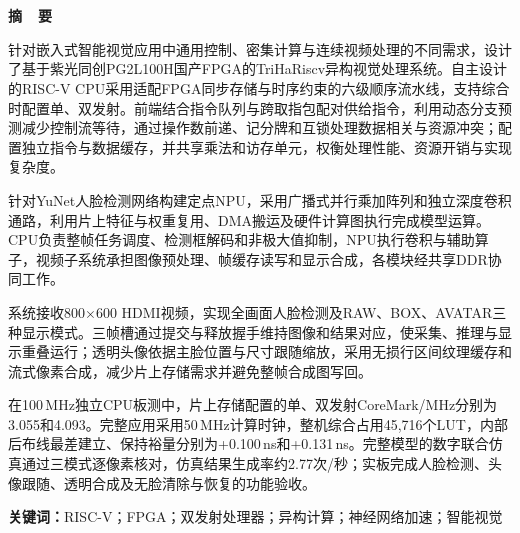 \chapter*{\worktitle}

\begin{center}
\sffamily\bfseries{} 摘\ \ 要
\end{center}

针对嵌入式智能视觉应用中通用控制、密集计算与连续视频处理的不同需求，设计了基于紫光同创PG2L100H国产FPGA的TriHaRiscv异构视觉处理系统。自主设计的RISC-V CPU采用适配FPGA同步存储与时序约束的六级顺序流水线，支持综合时配置单、双发射。前端结合指令队列与跨取指包配对供给指令，利用动态分支预测减少控制流等待，通过操作数前递、记分牌和互锁处理数据相关与资源冲突；配置独立指令与数据缓存，并共享乘法和访存单元，权衡处理性能、资源开销与实现复杂度。

针对YuNet人脸检测网络构建定点NPU，采用广播式并行乘加阵列和独立深度卷积通路，利用片上特征与权重复用、DMA搬运及硬件计算图执行完成模型运算。CPU负责整帧任务调度、检测框解码和非极大值抑制，NPU执行卷积与辅助算子，视频子系统承担图像预处理、帧缓存读写和显示合成，各模块经共享DDR协同工作。

系统接收800$\times$600 HDMI视频，实现全画面人脸检测及RAW、BOX、AVATAR三种显示模式。三帧槽通过提交与释放握手维持图像和结果对应，使采集、推理与显示重叠运行；透明头像依据主脸位置与尺寸跟随缩放，采用无损行区间纹理缓存和流式像素合成，减少片上存储需求并避免整帧合成图写回。

在100\,MHz独立CPU板测中，片上存储配置的单、双发射CoreMark/MHz分别为3.055和4.093。完整应用采用50\,MHz计算时钟，整机综合占用45,716个LUT，内部后布线最差建立、保持裕量分别为+0.100\,ns和+0.131\,ns。完整模型的数字联合仿真通过三模式逐像素核对，仿真结果生成率约2.77次/秒；实板完成人脸检测、头像跟随、透明合成及无脸清除与恢复的功能验收。

\noindent\textbf{关键词：}RISC-V；FPGA；双发射处理器；异构计算；神经网络加速；智能视觉
